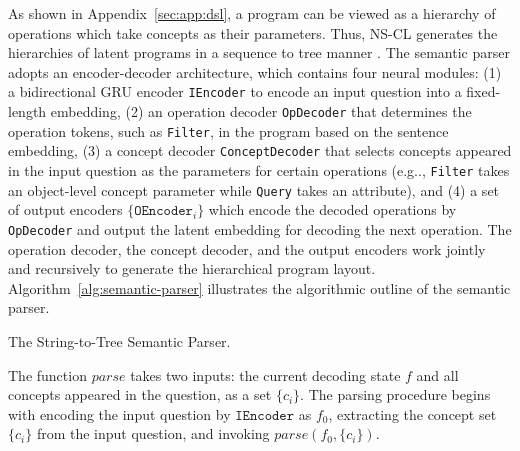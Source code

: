 \documentclass{article} \usepackage{iclr2019_conference,times}
\makeatletter
\DeclareRobustCommand\onedot{\futurelet\@let@token\@onedot}
\def\@onedot{\ifx\@let@token.\else.\null\fi\xspace}
\def\eg{e.g\onedot} \def\Eg{E.g\onedot}
\newcommand{\model}{NS-CL\xspace}
\makeatother
\begin{document}
As shown in Appendix~\ref{sec:app:dsl}, a program can be viewed as a hierarchy of operations which take concepts as their parameters. Thus, \model generates the hierarchies of latent programs in a sequence to tree manner \citep{Dong2016Language}. The semantic parser adopts an encoder-decoder architecture, which contains four neural modules: (1) a bidirectional GRU encoder {\tt IEncoder} \citep{Cho2014Learning} to encode an input question into a fixed-length embedding, (2) an operation decoder {\tt OpDecoder} that determines the operation tokens, such as {\tt Filter}, in the program based on the sentence embedding, (3) a concept decoder {\tt ConceptDecoder} that selects concepts appeared in the input question as the parameters for certain operations (\eg, {\tt Filter} takes an object-level concept parameter while {\tt Query} takes an attribute), and (4) a set of output encoders $\{\texttt{OEncoder}_i\}$ which encode the decoded operations by {\tt OpDecoder} and output the latent embedding for decoding the next operation. The operation decoder, the concept decoder, and the output encoders work jointly and recursively to generate the hierarchical program layout. Algorithm~\ref{alg:semantic-parser} illustrates the algorithmic outline of the semantic parser.

\begin{algorithm}[h]
\caption{The String-to-Tree Semantic Parser.}
\label{alg:semantic-parser}
\end{algorithm}

The function $parse$ takes two inputs: the current decoding state $f$ and all concepts appeared in the question, as a set $\{c_i\}$. The parsing procedure begins with encoding the input question by $\texttt{IEncoder}$ as $f_0$, extracting the concept set $\{c_i\}$ from the input question, and invoking $parse(f_0, \{c_i\})$.
\end{document}
